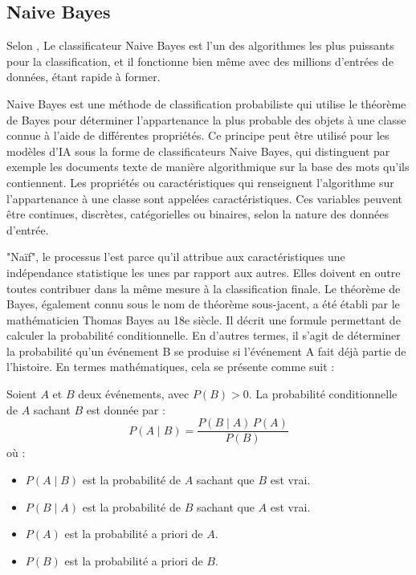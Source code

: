 \subsection{Naive Bayes}
Selon \cite{zhang2011novel}, Le classificateur Naive Bayes est l'un des algorithmes les plus puissants pour la classification, et il fonctionne bien même avec des millions d'entrées de données, étant rapide à former.\par
Naive Bayes \cite{konfuzio} est une méthode de classification probabiliste qui utilise le théorème de Bayes pour déterminer l'appartenance la plus probable des objets à une classe connue à l'aide de différentes propriétés. Ce principe peut être utilisé pour les modèles d'IA sous la forme de classificateurs Naive Bayes, qui distinguent par exemple les documents texte de manière algorithmique sur la base des mots qu'ils contiennent. Les propriétés ou caractéristiques qui renseignent l'algorithme sur l'appartenance à une classe sont appelées caractéristiques. Ces variables peuvent être continues, discrètes, catégorielles ou binaires, selon la nature des données d'entrée. \par

"Naïf", \cite{konfuzio} le processus l'est parce qu'il attribue aux caractéristiques une indépendance statistique les unes par rapport aux autres. Elles doivent en outre toutes contribuer dans la même mesure à la classification finale. Le théorème de Bayes, également connu sous le nom de théorème sous-jacent, a été établi par le mathématicien Thomas Bayes au 18e siècle. Il décrit une formule permettant de calculer la probabilité conditionnelle. En d'autres termes, il s'agit de déterminer la probabilité qu'un événement B se produise si l'événement A fait déjà partie de l'histoire. En termes mathématiques, cela se présente comme suit :

\begin{theorem} 
Soient \( A \) et \( B \) deux événements, avec \( P(B) > 0 \). La probabilité conditionnelle de \( A \) sachant \( B \) est donnée par :
\[
P(A \mid B) = \frac{P(B \mid A) \, P(A)}{P(B)}
\]
où :
\begin{itemize}
    \item \( P(A \mid B) \) est la probabilité de \( A \) sachant que \( B \) est vrai.
    \item \( P(B \mid A) \) est la probabilité de \( B \) sachant que \( A \) est vrai.
    \item \( P(A) \) est la probabilité a priori de \( A \).
    \item \( P(B) \) est la probabilité a priori de \( B \).
\end{itemize}
\end{theorem}
\par

